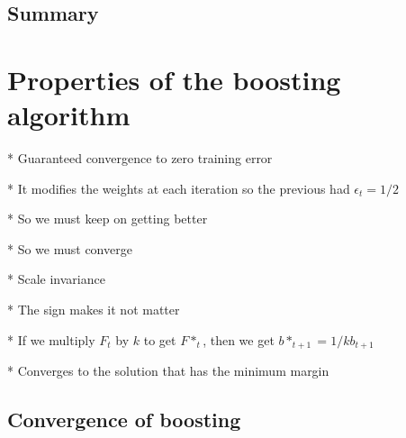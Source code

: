 \subsection{Summary}



\section{Properties of the boosting algorithm}

* Guaranteed convergence to zero training error

  * It modifies the weights at each iteration so the previous had
    $\epsilon_t = 1/2$

  * So we must keep on getting better

  * So we must converge

* Scale invariance

  * The sign makes it not matter

  * If we multiply $F_t$ by $k$ to get $F*_t$, then we get $b*_{t+1} = 1/k
    b_{t+1}$

* Converges to the solution that has the minimum margin
	
\subsection{Convergence of boosting}

